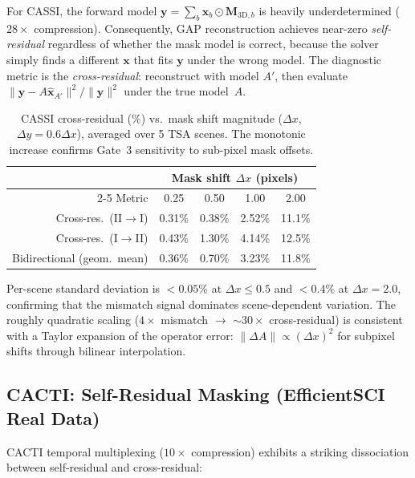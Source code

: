 \documentclass[11pt]{article}
\theoremstyle{definition}
\begin{document}
For CASSI, the forward model $\mathbf{y} = \sum_b \mathbf{x}_b \odot \mathbf{M}_{3\mathrm{D},b}$ is heavily underdetermined ($28\times$ compression).
Consequently, GAP reconstruction achieves near-zero \emph{self-residual} regardless of whether the mask model is correct, because the solver simply finds a different $\mathbf{x}$ that fits $\mathbf{y}$ under the wrong model.
The diagnostic metric is the \emph{cross-residual}: reconstruct with model $A'$, then evaluate $\|\mathbf{y} - A\hat{\mathbf{x}}_{A'}\|^2 / \|\mathbf{y}\|^2$ under the true model~$A$.

\begin{table}[!ht]
\centering\small
\caption{CASSI cross-residual (\%) vs.\ mask shift magnitude ($\Delta x$, $\Delta y = 0.6\Delta x$), averaged over 5 TSA scenes.
The monotonic increase confirms Gate~3 sensitivity to sub-pixel mask offsets.}
\label{tab:cassi_cross_res}
\begin{tabular}{@{}rcccc@{}}
\toprule
& \multicolumn{4}{c}{Mask shift $\Delta x$ (pixels)} \\
\cmidrule(l){2-5}
Metric & 0.25 & 0.50 & 1.00 & 2.00 \\
\midrule
Cross-res.\ (II$\to$I)  & 0.31\% & 0.38\% & 2.52\% & 11.1\% \\
Cross-res.\ (I$\to$II)  & 0.43\% & 1.30\% & 4.14\% & 12.5\% \\
Bidirectional (geom.\ mean)  & 0.36\% & 0.70\% & 3.23\% & 11.8\% \\
\bottomrule
\end{tabular}
\end{table}

\noindent Per-scene standard deviation is $< 0.05\%$ at $\Delta x \leq 0.5$ and $< 0.4\%$ at $\Delta x = 2.0$, confirming that the mismatch signal dominates scene-dependent variation.
The roughly quadratic scaling ($4\times$ mismatch $\to$ ${\sim}30\times$ cross-residual) is consistent with a Taylor expansion of the operator error: $\|\Delta A\| \propto (\Delta x)^2$ for subpixel shifts through bilinear interpolation.

\subsection{CACTI: Self-Residual Masking (EfficientSCI Real Data)}
\label{sec:cacti_cross}

CACTI temporal multiplexing ($10\times$ compression) exhibits a striking dissociation between self-residual and cross-residual:
\end{document}
